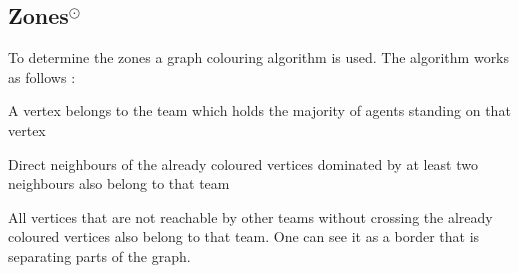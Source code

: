 \subsection[Zones]{Zones$^{\odot}$}
To determine the zones a graph colouring algorithm is used.
The algorithm works as follows \cite{MAPC}:
\begin{description}
	\item A vertex belongs to the team which holds the majority of agents standing on that vertex
	\item Direct neighbours of the already coloured vertices dominated by at least two neighbours also belong to that team
	\item All vertices that are not reachable by other teams without crossing the already coloured vertices also belong to that team.
    One can see it as a border that	is separating parts of the graph.
\end{description}
